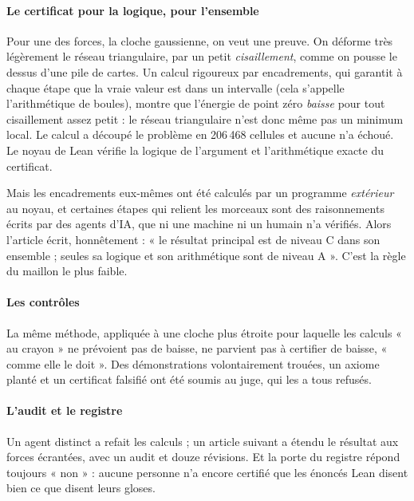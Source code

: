 \paragraph{Le certificat  pour la logique,  pour l'ensemble} Pour une des forces, la cloche
gaussienne, on veut une preuve. On déforme très légèrement le réseau triangulaire, par un petit \emph{cisaillement},
comme on pousse le dessus d'une pile de cartes. Un calcul rigoureux par encadrements, qui garantit à chaque étape que
la vraie valeur est dans un intervalle (cela s'appelle l'arithmétique de boules), montre que l'énergie de point zéro
\emph{baisse} pour tout cisaillement assez petit : le réseau triangulaire n'est donc même pas un minimum local. Le
calcul a découpé le problème en 206\,468 cellules et aucune n'a échoué. Le noyau de Lean vérifie la logique de
l'argument et l'arithmétique exacte du certificat.

Mais les encadrements eux-mêmes ont été calculés par un programme \emph{extérieur} au noyau, et certaines étapes qui
relient les morceaux sont des raisonnements écrits par des agents d'IA, que ni une machine ni un humain n'a vérifiés. Alors l'article écrit, honnêtement : « le résultat principal est
de niveau C dans son ensemble ; seules sa logique et son arithmétique sont de niveau A ». C'est la règle du maillon le
plus faible.

\paragraph{Les contrôles} La même méthode, appliquée à une cloche plus étroite pour laquelle les calculs « au crayon »
ne prévoient pas de baisse, ne parvient pas à certifier de baisse, « comme elle le doit ». Des démonstrations
volontairement trouées, un axiome planté et un certificat falsifié ont été soumis au juge, qui les a tous refusés.

\paragraph{L'audit et le registre} Un agent distinct a refait les calculs ; un article suivant a étendu le résultat aux
forces écrantées, avec un audit et douze révisions. Et la porte du registre répond toujours
« non » : aucune personne n'a encore certifié que les énoncés Lean disent bien ce que disent leurs gloses.

